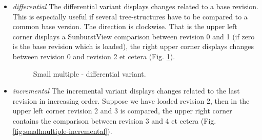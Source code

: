 \begin{itemize}
\item \emph{differential} The differential variant displays changes related to a base revision. This is especially useful if several tree-structures have to be compared to a common base version. The direction is clockwise. That is the upper left corner displays a SunburstView comparison between revision 0 and 1 (if zero is the base revision which is loaded), the right upper corner displays changes between revision 0 and revision 2 et cetera (Fig. \ref{fig:smallmultiple-differential}).

\begin{figure}[tb]
\caption{\label{fig:smallmultiple-differential} Small multiple - differential variant.}
\end{figure}

\item \emph{incremental} The incremental variant displays changes related to the last revision in increasing order. Suppose we have loaded revision 2, then in the upper left corner revision 2 and 3 is compared, the upper right corner contains the comparison between revision 3 and 4 et cetera (Fig. \ref{fig:smallmultiple-incremental}).


\end{itemize}
